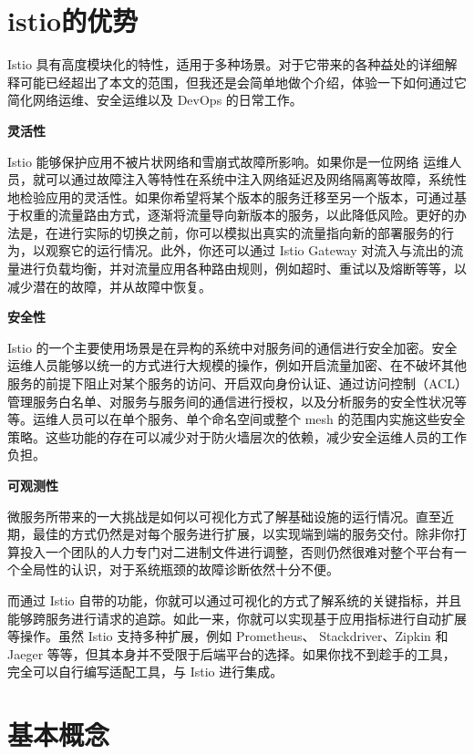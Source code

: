 \documentclass{ctexart}
\begin{document}
\section{istio的优势}
Istio 具有高度模块化的特性，适用于多种场景。对于它带来的各种益处的详细解释可能已经超出了本文的范围，但我还是会简单地做个介绍，体验一下如何通过它简化网络运维、安全运维以及 DevOps 的日常工作。

\textbf{灵活性}

Istio 能够保护应用不被片状网络和雪崩式故障所影响。如果你是一位网络 运维人员，就可以通过故障注入等特性在系统中注入网络延迟及网络隔离等故障，系统性地检验应用的灵活性。如果你希望将某个版本的服务迁移至另一个版本，可通过基于权重的流量路由方式，逐渐将流量导向新版本的服务，以此降低风险。更好的办法是，在进行实际的切换之前，你可以模拟出真实的流量指向新的部署服务的行为，以观察它的运行情况。此外，你还可以通过 Istio Gateway 对流入与流出的流量进行负载均衡，并对流量应用各种路由规则，例如超时、重试以及熔断等等，以减少潜在的故障，并从故障中恢复。

\textbf{安全性}

Istio 的一个主要使用场景是在异构的系统中对服务间的通信进行安全加密。安全运维人员能够以统一的方式进行大规模的操作，例如开启流量加密、在不破坏其他服务的前提下阻止对某个服务的访问、开启双向身份认证、通过访问控制（ACL）管理服务白名单、对服务与服务间的通信进行授权，以及分析服务的安全性状况等等。运维人员可以在单个服务、单个命名空间或整个 mesh 的范围内实施这些安全策略。这些功能的存在可以减少对于防火墙层次的依赖，减少安全运维人员的工作负担。

\textbf{可观测性}

微服务所带来的一大挑战是如何以可视化方式了解基础设施的运行情况。直至近期，最佳的方式仍然是对每个服务进行扩展，以实现端到端的服务交付。除非你打算投入一个团队的人力专门对二进制文件进行调整，否则仍然很难对整个平台有一个全局性的认识，对于系统瓶颈的故障诊断依然十分不便。

而通过 Istio 自带的功能，你就可以通过可视化的方式了解系统的关键指标，并且能够跨服务进行请求的追踪。如此一来，你就可以实现基于应用指标进行自动扩展等操作。虽然 Istio 支持多种扩展，例如 Prometheus、 Stackdriver、Zipkin 和 Jaeger 等等，但其本身并不受限于后端平台的选择。如果你找不到趁手的工具，完全可以自行编写适配工具，与 Istio 进行集成。








\section{基本概念}
\end{document}
